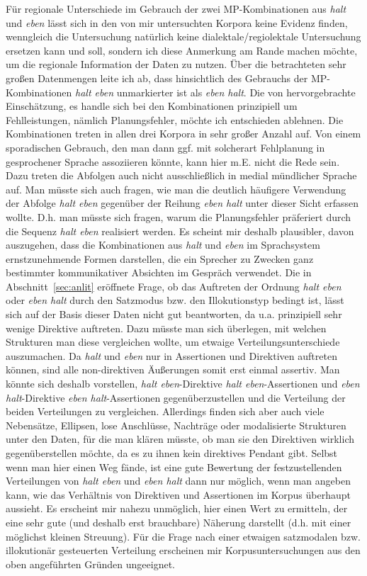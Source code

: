 Für regionale Unterschiede im Gebrauch der zwei MP-Kombinationen aus \textit{halt} und \textit{eben} lässt sich in den von mir untersuchten Korpora keine Evidenz finden, wenngleich die Untersuchung natürlich keine dialektale/regiolektale Untersuchung ersetzen kann und soll, sondern ich diese Anmerkung am Rande machen möchte, um die regionale Information der Daten zu nutzen. Über die be\-trachteten sehr großen Datenmengen leite ich ab, dass hinsichtlich des Gebrauchs der MP-Kombi\-nationen \textit{halt eben} unmarkierter ist als \textit{eben halt}. Die von \citet{Autenrieth2002} hervorgebrachte Einschätzung, es handle sich bei den Kombinationen prinzipiell um Fehlleistungen, nämlich Planungsfehler, möchte ich entschieden ablehnen. Die Kombinationen treten in allen drei Korpora in sehr großer Anzahl auf. Von einem sporadischen Gebrauch, den man dann ggf. mit solcherart Fehlplanung in gesprochener Sprache assoziieren könnte, kann hier m.E. nicht die Rede sein. Dazu treten die Abfolgen auch nicht ausschließlich in medial mündlicher Sprache auf. Man müsste sich auch fragen, wie man die deutlich häufigere Verwendung der Abfolge \textit{halt eben} gegenüber der Reihung \textit{eben halt} unter dieser Sicht erfassen wollte. D.h. man müsste sich fragen, warum die Planungsfehler präferiert durch die Sequenz \textit{halt eben} realisiert werden. Es scheint mir deshalb plausibler, davon auszugehen, dass die Kombinationen aus \textit{halt} und \textit{eben} im Sprachsystem ernstzunehmende Formen darstellen, die ein Sprecher zu Zwecken ganz bestimmter kommunikativer Absichten im Gespräch verwendet. Die in Abschnitt~\ref{sec:anlit} eröff\-nete Frage, ob das Auftreten der Ordnung \textit{halt eben} oder \textit{eben halt} durch den Satzmodus  bzw. den Illokutionstyp  bedingt ist, lässt sich auf der Basis dieser Daten nicht gut beantworten, da u.a. prinzipiell sehr wenige Direktive auftreten. Dazu müsste man sich überlegen, mit welchen Strukturen man diese vergleichen wollte, um etwaige Verteilungsunterschiede auszumachen. Da \textit{halt} und \textit{eben} nur in Assertionen und Direktiven auftreten können, sind alle non-direktiven Äußerungen somit erst einmal assertiv. Man könnte sich deshalb vorstellen, \textit{halt eben}-Direktive \textit{halt eben}-Assertionen und \textit{eben halt}-Direktive \textit{eben halt}-Assertio\-nen gegenüberzustellen und die Verteilung der beiden Verteilungen zu vergleichen. Allerdings finden sich aber auch viele Nebensätze, Ellipsen, lose Anschlüsse, Nachträge oder modalisierte Strukturen unter den Daten, für die man klären müsste, ob man sie den Direktiven wirklich gegenüberstellen möchte, da es zu ihnen kein direktives \glq Pendant\grq {} gibt. Selbst wenn man hier einen Weg fände, ist eine gute Bewertung der festzustellenden Verteilungen von \textit{halt eben} und \textit{eben halt} dann nur möglich, wenn man angeben kann, wie das Verhältnis von Direktiven und Assertionen im Korpus überhaupt aussieht. Es erscheint mir nahezu unmöglich, hier einen Wert zu ermitteln, der eine sehr gute (und deshalb erst brauchbare) Näherung darstellt (d.h. mit einer möglichst kleinen Streuung). Für die Frage nach einer etwaigen satzmodalen bzw. illokutionär ge\-steuerten Verteilung erscheinen mir Korpusuntersuchungen aus den oben angeführten Gründen ungeeignet.

